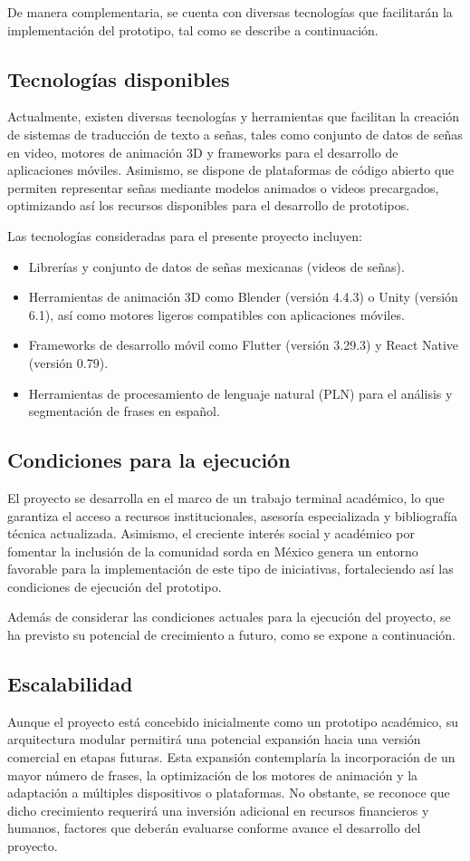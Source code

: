 De manera complementaria, se cuenta con diversas tecnologías que facilitarán la implementación del prototipo, tal como se describe a continuación.

\subsection{Tecnologías disponibles}
Actualmente, existen diversas tecnologías y herramientas que facilitan la creación de sistemas de traducción de texto a señas, tales como conjunto de datos de señas en video, motores de animación 3D y frameworks para el desarrollo de aplicaciones móviles. Asimismo, se dispone de plataformas de código abierto que permiten representar señas mediante modelos animados o videos precargados, optimizando así los recursos disponibles para el desarrollo de prototipos.

Las tecnologías consideradas para el presente proyecto incluyen:
\begin{itemize} 
	\item Librerías y conjunto de datos de señas mexicanas (videos de señas). 
	\item Herramientas de animación 3D como Blender (versión 4.4.3) o Unity (versión 6.1), así como motores ligeros compatibles con aplicaciones móviles. 
	\item Frameworks de desarrollo móvil como Flutter (versión 3.29.3) y React Native (versión 0.79). 
	\item Herramientas de procesamiento de lenguaje natural (PLN) para el análisis y segmentación de frases en español. 
\end{itemize}

\subsection{Condiciones para la ejecución}
El proyecto se desarrolla en el marco de un trabajo terminal académico, lo que garantiza el acceso a recursos institucionales, asesoría especializada y bibliografía técnica actualizada. Asimismo, el creciente interés social y académico por fomentar la inclusión de la comunidad sorda en México genera un entorno favorable para la implementación de este tipo de iniciativas, fortaleciendo así las condiciones de ejecución del prototipo.

Además de considerar las condiciones actuales para la ejecución del proyecto, se ha previsto su potencial de crecimiento a futuro, como se expone a continuación.

\subsection{Escalabilidad}
Aunque el proyecto está concebido inicialmente como un prototipo académico, su arquitectura modular permitirá una potencial expansión hacia una versión comercial en etapas futuras. Esta expansión contemplaría la incorporación de un mayor número de frases, la optimización de los motores de animación y la adaptación a múltiples dispositivos o plataformas. No obstante, se reconoce que dicho crecimiento requerirá una inversión adicional en recursos financieros y humanos, factores que deberán evaluarse conforme avance el desarrollo del proyecto.

